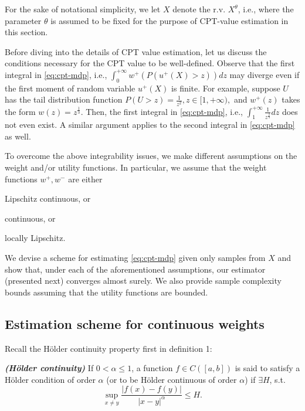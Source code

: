 For the sake of notational simplicity, we let $X$ denote the r.v. $X^\theta$, i.e., where the parameter $\theta$ is assumed to be fixed for the purpose of CPT-value estimation in this section. 

Before diving into the details of CPT value estimation, let us discuss the conditions necessary for the CPT value to be well-defined.
Observe that the first integral in \eqref{eq:cpt-mdp}, i.e., 
$\int_0^{+\infty} w^+(P(u^+(X)>z)) d z$
may diverge even if the first moment of random variable $u^+(X)$ is finite. 
For example, suppose $U$ has the tail distribution function
$P(U>z)  = \frac{1}{z^2}, z\in [1, +\infty),$
 and $w^+(z)$ takes the form $w(z) = z^{\frac{1}{3}}$. Then, the first integral in \eqref{eq:cpt-mdp}, i.e.,
$
\int_1^{+\infty} \frac{1}{z^{\frac{2}{3}}} dz
$
does not even exist. A similar argument applies to the second integral in \eqref{eq:cpt-mdp} as well.

To overcome the above integrability issues, we make different assumptions on the weight and/or utility functions. In particular, we assume that the weight functions $w^+, w^-$ are either 
\begin{inparaenum}[\it (i)]
\item Lipschitz continuous, or
\item \holder continuous, or
\item locally Lipschitz.
\end{inparaenum}
We devise a scheme for estimating \eqref{eq:cpt-mdp} given only samples from $X$ and show that, under each of the aforementioned assumptions, our estimator (presented next) converges almost surely. 
We also provide sample complexity bounds assuming that the utility functions are bounded.

\subsection{Estimation scheme for \holder continuous weights}
Recall the H\"{o}lder continuity property first in definition 1:
\begin{definition}\label{holder}
{\textbf{\textit{(H\"{o}lder continuity)}}}
If $0 < \alpha \leq 1$, a function $f \in C([a,b])$ is said to satisfy
a H\"{o}lder condition of order $\alpha$ (or to be H\"{o}lder continuous
of order $\alpha$) if $\exists H$, s.t.
\[
\sup_{x \neq y} \frac{| f(x) - f(y) |}{| x-y |^{\alpha}} \leq H .
\]
\end{definition}

